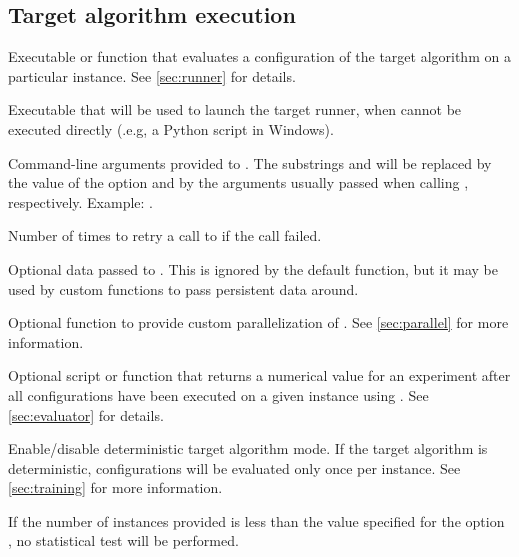 \subsection[Target algorithm execution]{Target algorithm execution}
\begin{description}
Executable or \aR function that evaluates a configuration of the target algorithm on a particular instance. See \autoref{sec:runner} for details.

Executable that will be used to launch the target runner, when  cannot be executed directly (.e.g, a Python script in Windows).

Command-line arguments provided to . The substrings  and  will be replaced by the value of the option  and by the arguments usually passed when calling , respectively. Example: .

Number of times to retry a call to  if the call failed.

Optional data passed to . This is ignored by the default  function, but it may be used by custom  functions to pass persistent data around.

 Optional \aR function to provide custom parallelization of . See \autoref{sec:parallel} for more information.

Optional script or \aR function that returns a numerical value for an experiment after all configurations have been executed on a given instance using . See \autoref{sec:evaluator} for details.

  Enable/disable deterministic target algorithm mode. If the target algorithm is deterministic, configurations will be evaluated only once per instance. See \autoref{sec:training} for more information.
\begin{xwarningbox}
 If the number of instances provided is less than the value specified for the option , no statistical test will be performed.
\end{xwarningbox}


\end{description}
